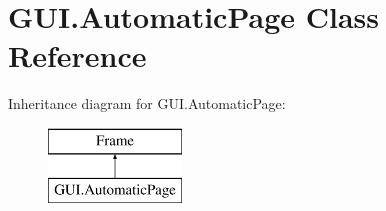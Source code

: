 \hypertarget{class_g_u_i_1_1_automatic_page}{}\section{G\+U\+I.\+Automatic\+Page Class Reference}
\label{class_g_u_i_1_1_automatic_page}
Inheritance diagram for G\+U\+I.\+Automatic\+Page\+:\begin{figure}[H]
\begin{center}
\leavevmode
\includegraphics[height=2.000000cm]{class_g_u_i_1_1_automatic_page}
\end{center}
\end{figure}
